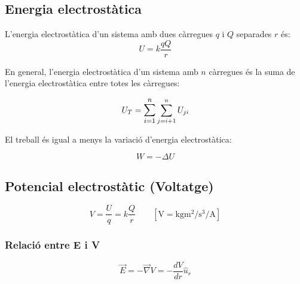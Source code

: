 \subsection{Energia electrostàtica}
\begin{multicols}{2}

    \label{sub:energia_electrostatica}
    L'energia electrostàtica d'un sistema amb dues càrregues $q$ i $Q$ separades $r$ és:
    \begin{equation}
        U = k \frac{qQ}{r}
    \end{equation}

    En general, l'energia electrostàtica d'un sistema amb $n$ càrregues és la suma
    de l'energia electrostàtica entre totes les càrregues:

    \begin{equation}
        U_T = \mathlarger{\sum_{i=1}^n} \sum_{j=i+1}^n U_{ji}
    \end{equation}

    El treball és igual a menys la variació d'energia electrostàtica:

    \begin{equation}
        W = - \Delta U
    \end{equation}

\end{multicols}

\subsection{Potencial electrostàtic (Voltatge)}
\label{sub:potencial_electrostatic_voltatge_}

\begin{multicols}{2}

    \begin{equation}
        V = \frac{U}{q} = k \frac{Q}{r} \qquad \left[\si{\volt} = \si{\kilo\gram\metre\squared\per\second\cubed\per\ampere} \right]
    \end{equation}

    \subsubsection{Relació entre E i V}
    \label{ssub:relaci_entre_e_i_v}

    \begin{equation}
        \vec{E} = - \vec{\nabla} V = - \frac{dV}{dr} \hat{u}_r
    \end{equation}


\end{multicols}


